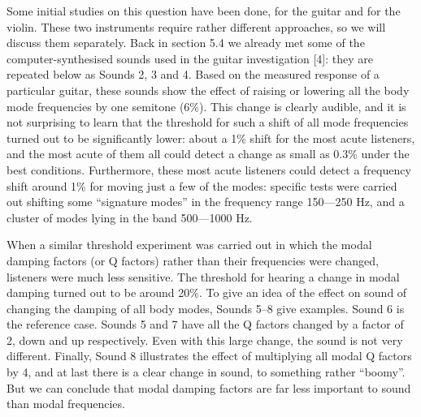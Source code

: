   Some initial studies on this question have been done, for the guitar and for 
  the violin. These two instruments require rather different approaches, so we 
  will discuss them separately. Back in section 5.4 we already met some of the 
  computer-synthesised sounds used in the guitar investigation [4]: they are 
  repeated below as Sounds 2, 3 and 4. Based on the measured response of a 
  particular guitar, these sounds show the effect of raising or lowering all 
  the body mode frequencies by one semitone (6\%). This change is clearly 
  audible, and it is not surprising to learn that the threshold for such a 
  shift of all mode frequencies turned out to be significantly lower: about a 
  1\% shift for the most acute listeners, and the most acute of them all could 
  detect a change as small as 0.3\% under the best conditions. Furthermore, 
  these most acute listeners could detect a frequency shift around 1\% for 
  moving just a few of the modes: specific tests were carried out shifting some 
  “signature modes” in the frequency range 150—250 Hz, and a cluster of modes 
  lying in the band 500—1000 Hz. 




  When a similar threshold experiment was carried out in which the modal 
  damping factors (or Q factors) rather than their frequencies were changed, 
  listeners were much less sensitive. The threshold for hearing a change in 
  modal damping turned out to be around 20\%. To give an idea of the effect on 
  sound of changing the damping of all body modes, Sounds 5--8 give examples. 
  Sound 6 is the reference case. Sounds 5 and 7 have all the Q factors changed 
  by a factor of 2, down and up respectively. Even with this large change, the 
  sound is not very different. Finally, Sound 8 illustrates the effect of 
  multiplying all modal Q factors by 4, and at last there is a clear change in 
  sound, to something rather ``boomy''. But we can conclude that modal damping 
  factors are far less important to sound than modal frequencies. 



